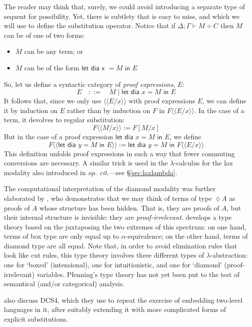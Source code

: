 \documentclass[a4paper]{amsart}
\newcommand{\ctxt}[2]{#1\mathrel{;}#2}
\begin{document}
The reader may think that, surely, we could avoid introducing a
separate type of sequent for possibility. Yet, there is subtlety
that is easy to miss, and which we will use to define the
substitution operator. Notice that if $\ctxt{\Delta}{\Gamma}
\vdash M \div C$ then $M$ can be of one of two forms:
\begin{itemize}
  \item $M$ can be any term; or
  \item $M$ can be of the form 
    $\textsf{let dia x } = M \textsf{ in } E$
\end{itemize} So, let us define a syntactic category of
\emph{proof expressions}, $E$: \[
  E \quad ::= \quad M \;|\; \textsf{let dia } x = M \textsf{ in } E
\] It follows that, since we only use $\langle\langle E /
x\rangle\rangle$ with proof expressions $E$, we can define it by
induction on $E$ rather than by induction on $F$ in
$F\langle\langle E/x\rangle\rangle$. In the case of a term, it
devolves to regular substitution: \[
  F\langle\langle M/x\rangle\rangle := F[M/x]
\] But in the case of a proof expression $\textsf{let dia } x = M
\textsf{ in } E$, we define \[
  F\langle\langle\textsf{let dia } y = M \textsf{ in } E\rangle\rangle := 
  \textsf{let dia } y = M \textsf{ in } F\langle\langle E/x\rangle\rangle
\] This definition unfolds proof expressions in such a way that
fewer commuting conversions are necessary. A similar trick is used
in the $\lambda$-calculus for the lax modality also introduced in
\emph{op. cit.}---see \S \ref{sec:laxlambda}.

The computational interpretation of the diamond modality was
further elaborated by \cite{Pfenning2001}, who demonstrates
that we may think of terms of type $\lozenge A$ as proofs of $A$
whose structure has been hidden.  That is, they are proofs of $A$,
but their internal structure is invisible: they are
\emph{proof-irrelevant}. \cite{Pfenning2001} develops a type
theory based on the juxtaposing the two extremes of this spectrum:
on one hand, terms of box type are only equal up to
$\alpha$-equivalence; on the other hand, terms of diamond type are
all equal. Note that, in order to avoid elimination rules that
look like cut rules, this type theory involves three different
types of $\lambda$-abstraction: one for `boxed' (intensional), one
for intuitionistic, and one for `diamond' (proof-irrelevant)
variables. Pfenning's type theory has not yet been put to the test
of semantical (and/or categorical) analysis.


\cite{Ghani1998} also discuss \textsf{DCS4}, which they use to
repeat the exercise of embedding two-level languages in it, after
suitably extending it with more complicated forms of explicit
substitutions.
\end{document}

